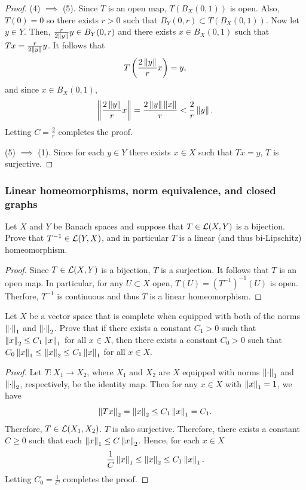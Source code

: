 \documentclass[a4paper]{article}
\begin{document}
\begin{proof}
  (4) $\implies$ (5). Since $T$ is an open map, $T(B_X(0, 1))$ is
  open. Also, $T(0) = 0$ so there exists $r > 0$ such that
  $B_Y(0, r) \subset T(B_X(0, 1))$. Now let $y \in Y$. Then,
  $\frac{r}{2 \left\lVert y\right\rVert} y \in B_Y(0, r)$ and there exists
  $x \in B_X(0, 1)$ such that $Tx = \frac{r}{2 \left\lVert y\right\rVert} y$.
  It follows that
  \[
  T \left( \frac{2\left\lVert y\right\rVert}{r} x \right) = y,
  \]
  and since $x \in B_X(0, 1)$,
  \[
  \left\lVert \frac{2 \left\lVert y\right\rVert}{r} x\right\rVert = \frac{2 \left\lVert y\right\rVert \left\lVert x\right\rVert}{r}
  < \frac{2}{r} \left\lVert y\right\rVert.
  \]
  Letting $C = \frac{2}{r}$ completes the proof.

  (5) $\implies$ (1). Since for each $y \in Y$ there exists
  $x \in X$ such that $T x = y$, $T$ is surjective.

\end{proof}

\subsubsection*{Linear homeomorphisms, norm equivalence,
and closed graphs}
\begin{thm}
  Let $X$ and $Y$ be Banach spaces and suppose that
  $T \in \mathcal{L}(X,Y)$ is a bijection.  Prove that $T^{-1}
  \in \mathcal{L}(Y,X)$, and in particular $T$ is a linear
  (and thus bi-Lipschitz) homeomorphism.
\end{thm}

\begin{proof}
  Since $T \in \mathcal{L}(X, Y)$ is a bijection, $T$ is a surjection.
  It follows that $T$ is an open map. In particular, for any
  $U \subset X$ open, $T(U) = (T^{-1})^{-1}(U)$ is open. Therfore,
  $T^{-1}$ is continuous and thus $T$ is a linear homeomorphism.

\end{proof}

\begin{thm}
Let $X$ be a vector space that is complete when equipped
with both of the norms $\left\lVert \cdot\right\rVert_1$ and
$\left\lVert \cdot\right\rVert_2$.  Prove that if there exists a constant
$C_1>0$ such that $\left\lVert x\right\rVert_2 \leq C_1 \left\lVert x\right\rVert_1$ for all
$x \in X$, then there exists a constant $C_0 >0$ such that
$C_0 \left\lVert x\right\rVert_1 \leq \left\lVert x\right\rVert_2 \leq C_1 \left\lVert x\right\rVert_1$ for all
$x \in X$.
\end{thm}

\begin{proof}
Let $T: X_1 \to X_2$, where $X_1$ and $X_2$
are $X$ equipped with norms $\left\lVert \cdot\right\rVert_1$ and $\left\lVert \cdot\right\rVert_2$,
respectively, be the identity map. Then for any $x \in X$
with $\left\lVert x\right\rVert_1 = 1$, we have
\[
\left\lVert T x\right\rVert_2 = \left\lVert x\right\rVert_2 \leq C_1 \left\lVert x\right\rVert_1 = C_1.
\]
Therefore, $T \in \mathcal{L}(X_1, X_2)$. $T$ is also surjective.
Therefore, there exists a constant $C \geq 0$ such that
each $\left\lVert x\right\rVert_1 \leq C \left\lVert x\right\rVert_2$. Hence, for each
$x \in X$
\[
\frac{1}{C} \left\lVert x\right\rVert_1 \leq \left\lVert x\right\rVert_2 \leq C_1 \left\lVert x\right\rVert_1.
\]
Letting $C_0 = \frac{1}{C}$ completes the proof.

\end{proof}
\end{document}
